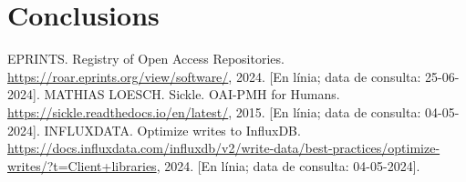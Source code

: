 \documentclass[lettersize,journal]{IEEEtran}
\begin{document}
\section{Conclusions}\label{sec:conclusions}

\begin{thebibliography}{1}

    EPRINTS. Registry of Open Access Repositories. \url{https://roar.eprints.org/view/software/}, 2024. [En línia; data de consulta: 25-06-2024].
    MATHIAS LOESCH. Sickle. OAI-PMH for Humans. \url{https://sickle.readthedocs.io/en/latest/}, 2015. [En línia; data de consulta: 04-05-2024].
    INFLUXDATA. Optimize writes to InfluxDB. \url{https://docs.influxdata.com/influxdb/v2/write-data/best-practices/optimize-writes/?t=Client+libraries}, 2024. [En línia; data de consulta: 04-05-2024].
\end{thebibliography}
\end{document}
